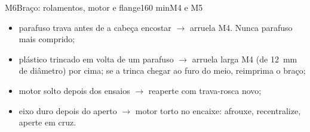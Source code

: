\documentclass[11pt,a4paper]{article}
\newcommand{\flecha}{\ensuremath{\rightarrow}}
\begin{document}
\begin{tarefa}{M6}{Braço: rolamentos, motor e flange}{1}{60 min}{M4 e M5}
\begin{itemize}
    raspando no furo do meio: limpe com o estilete. Nunca tente fechar a fresta apertando
    mais;
  \item parafuso trava antes de a cabeça encostar \flecha{} arruela M4. Nunca parafuso mais
    comprido;
  \item plástico trincado em volta de um parafuso \flecha{} arruela larga M4 (de
    12~mm de diâmetro) por cima; se a trinca chegar ao furo do meio, reimprima o braço;
  \item motor solto depois dos ensaios \flecha{} reaperte com trava-rosca novo;
  \item eixo duro depois do aperto \flecha{} motor torto no encaixe: afrouxe, recentralize,
    aperte em cruz.
\end{itemize}
\end{tarefa}
\end{document}
